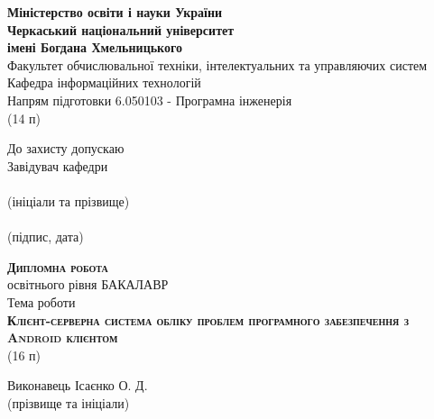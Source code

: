 \documentclass[../main.tex]{subfiles}
\begin{document}
\begin{titlepage}
    \centering
    {\bfseries\large
    Міністерство освіти і науки України \\
    Черкаський національний університет \\
    імені Богдана Хмельницького \\}
    Факультет обчислювальної техніки, інтелектуальних та управляючих систем \\
    Кафедра інформаційних технологій \\
    Напрям підготовки 6.050103 - Програмна інженерія \\
    (14 п) \\
    \begin{flushright}
        \begin{minipage}[t]{5cm}
            \begin{flushright}
            	\footnotesize
                До захисту допускаю \\
                Завідувач кафедри \\
                \hrulefill \\
                {\centering (ініціали та прізвище) \\ }
                \hrulefill \\
                {\centering (підпис, дата) \\ }
            \end{flushright}
        \end{minipage}
    \end{flushright}
    {\scshape\bfseries Дипломна робота \\}
    освітнього рівня БАКАЛАВР \\
    Тема роботи \\
    {\scshape\bfseries Клієнт-серверна система обліку проблем програмного забезпечення з Android клієнтом \\}
    (16 п) \\
    {\footnotesize
	    \begin{flushright}
			\begin{minipage}[t]{4.2cm}
				\begin{flushright}
					Виконавець Ісаєнко О. Д. \\
					{\centering (прізвище та ініціали) \\ }
				\end{flushright}
			\end{minipage}
		\end{flushright}
		\vspace{\baselineskip}
}
\end{titlepage}
\end{document}
